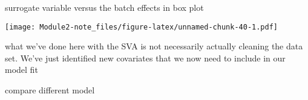 \documentclass[]{article}
\newenvironment{Shaded}{\begin{snugshade}}{\end{snugshade}}
\newcommand{\KeywordTok}[1]{\textcolor[rgb]{0.13,0.29,0.53}{\textbf{#1}}}
\newcommand{\DataTypeTok}[1]{\textcolor[rgb]{0.13,0.29,0.53}{#1}}
\newcommand{\DecValTok}[1]{\textcolor[rgb]{0.00,0.00,0.81}{#1}}
\newcommand{\StringTok}[1]{\textcolor[rgb]{0.31,0.60,0.02}{#1}}
\newcommand{\OperatorTok}[1]{\textcolor[rgb]{0.81,0.36,0.00}{\textbf{#1}}}
\newcommand{\NormalTok}[1]{#1}
\begin{document}
surrogate variable versus the batch effects in box plot

\begin{Shaded}
\end{Shaded}

\texttt{[image: Module2-note\_files/figure-latex/unnamed-chunk-40-1.pdf]}

what we've done here with the SVA is not necessarily actually cleaning
the data set. We've just identified new covariates that we now need to
include in our model fit

\begin{Shaded}
\end{Shaded}

compare different model
\end{document}
